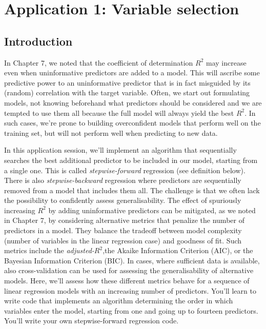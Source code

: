 \documentclass[
]{book}
\begin{document}
\hypertarget{application-1-variable-selection}{%
\chapter{Application 1: Variable selection}\label{application-1-variable-selection}}

\hypertarget{introduction-3}{%
\section{Introduction}\label{introduction-3}}

In Chapter 7, we noted that the coefficient of determination \(R^2\) may increase even when uninformative predictors are added to a model. This will ascribe some predictive power to an uninformative predictor that is in fact misguided by its (random) correlation with the target variable. Often, we start out formulating models, not knowing beforehand what predictors should be considered and we are tempted to use them all because the full model will always yield the best \(R^2\). In such cases, we're prone to building overconfident models that perform well on the training set, but will not perform well when predicting to new data.

In this application session, we'll implement an algorithm that sequentially searches the best additional predictor to be included in our model, starting from a single one. This is called \emph{stepwise-forward} regression (see definition below). There is also \emph{stepwise-backward} regression where predictors are sequentially removed from a model that includes them all. The challenge is that we often lack the possibility to confidently assess generalisability. The effect of spuriously increasing \(R^2\) by adding uninformative predictors can be mitigated, as we noted in Chapter 7, by considering alternative metrics that penalize the number of predictors in a model. They balance the tradeoff between model complexity (number of variables in the linear regression case) and goodness of fit. Such metrics include the \emph{adjusted-}\(R^2\),the Akaike Information Criterion (AIC), or the Bayesian Information Criterion (BIC). In cases, where sufficient data is available, also cross-validation can be used for assessing the generalisability of alternative models. Here, we'll assess how these different metrics behave for a sequence of linear regression models with an increasing number of predictors. You'll learn to write code that implements an algorithm determining the order in which variables enter the model, starting from one and going up to fourteen predictors. You'll write your own stepwise-forward regression code.
\end{document}
